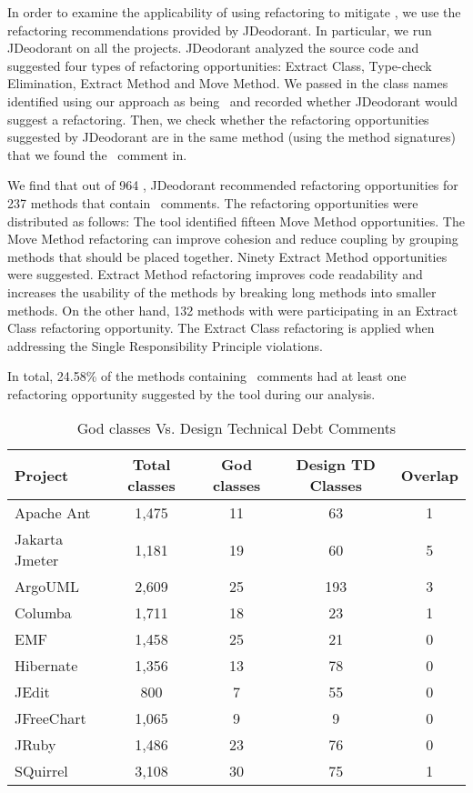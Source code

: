 In order to examine the applicability of using refactoring to mitigate \SADTD, we use the refactoring recommendations provided by JDeodorant. In particular, we run JDeodorant on all the projects. JDeodorant analyzed the source code and suggested four types of  refactoring opportunities: Extract Class, Type-check Elimination, Extract Method and Move Method. We passed in the class names identified using our approach as being \SADTD~and recorded whether JDeodorant would suggest a refactoring. Then, we check whether the refactoring opportunities suggested by JDeodorant are in the same method (using the method signatures) that we found the \SADTD~comment in. 

We find that out of 964 \SADTD, JDeodorant recommended refactoring opportunities for 237 methods that contain \SADTD~comments. The refactoring opportunities were distributed as follows: The tool identified fifteen Move Method opportunities. The Move Method refactoring can improve cohesion and reduce coupling by grouping methods that should be placed together. Ninety Extract Method opportunities were suggested. Extract Method refactoring improves code readability and increases the usability of the methods by breaking long methods into smaller methods. On the other hand, 132 methods with \SADTD were participating in an Extract Class refactoring opportunity. The Extract Class refactoring is applied when addressing the Single Responsibility Principle violations.


In total, 24.58\% of the methods containing \SADTD~comments had at least one refactoring opportunity suggested by the tool during our analysis.  


\begin{table*}[!hbt]
	\begin{center}
		\caption{God classes Vs. Design Technical Debt Comments}
		\vspace{-2mm}
		\label{tab:godclasscomparison}
		\begin{tabular}{l| c c c c} 
			\toprule
			\textbf{Project} & \textbf{Total classes} & \textbf{God classes} &  \textbf{Design TD Classes}  &  \textbf{Overlap}  \\ 
			\midrule
			Apache Ant & 1,475 & 11 & 63 & 1  \\ 
			Jakarta Jmeter & 1,181 & 19 & 60 & 5  \\
			ArgoUML & 2,609 & 25 & 193 & 3  \\
			Columba & 1,711 & 18 & 23 & 1  \\
			EMF & 1,458 & 25 & 21 & 0 \\
			Hibernate  & 1,356 & 13 & 78 & 0 \\
			JEdit & 800 & 7 & 55  & 0 \\
			JFreeChart & 1,065 & 9 & 9 & 0  \\
			JRuby & 1,486 & 23 & 76 & 0  \\
			SQuirrel  & 3,108 & 30 & 75 & 1 \\  
			\bottomrule
		\end{tabular}
	\end{center}
\end{table*}

